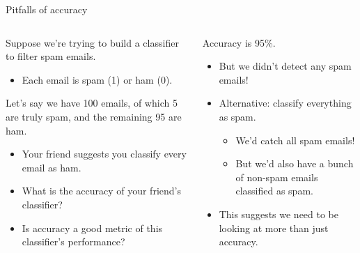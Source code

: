\documentclass[aspectratio=169]{../latex_main/tntbeamer}  %
\begin{document}
	
	
	\begin{frame}[c]{Pitfalls of accuracy}
	    \begin{columns}
	        \begin{column}{.5\textwidth}
                 Suppose we’re trying to build a classifier to filter spam emails.
        	    \begin{itemize}
        	        \item Each email is spam (1) or ham (0).
        	    \end{itemize}
        	    Let’s say we have 100 emails, of which 5 are truly spam, and the remaining 95 are ham.
        	    \begin{itemize}
        	        \item Your friend suggests you classify every email as ham.
        	        \item What is the accuracy of your friend’s classifier?
        	        \item Is accuracy a good metric of this classifier’s performance?
        	    \end{itemize}
	        \end{column}
	        
	        
	        \begin{column}{.5\textwidth}
	                Accuracy is 95\%.
                    \begin{itemize}
                        \item But we didn’t detect any spam emails!
                        \item Alternative: classify everything as spam.
                        \begin{itemize}
                            \item We’d catch all spam emails!
                            \item But we’d also have a bunch of non-spam emails classified as spam.
                        \end{itemize}
                        \item This suggests we need to be looking at more than just accuracy.
                    \end{itemize}
	        \end{column}
	    \end{columns}
	   
	\end{frame}
	
	
	
\end{document}
